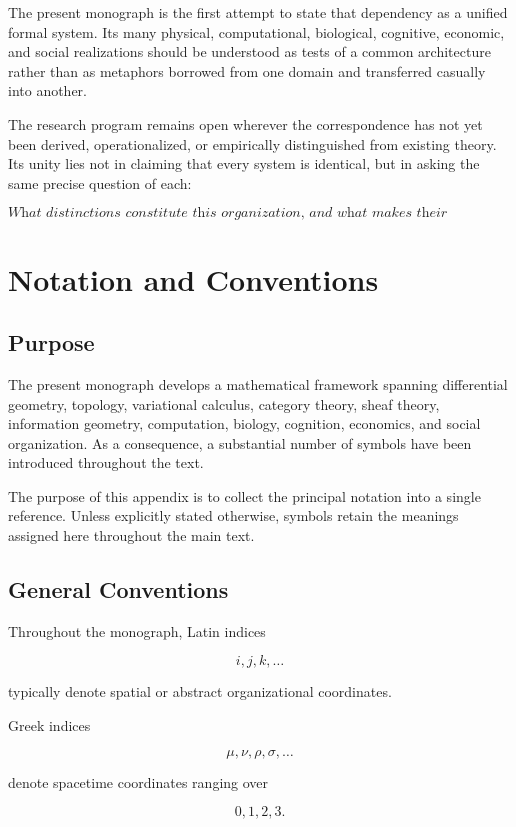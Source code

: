 \documentclass[11pt,oneside]{book}
\numberwithin{equation}{chapter}
\theoremstyle{definition}
\theoremstyle{plain}
\begin{document}
The present monograph is the first attempt to state that dependency as a
unified formal system. Its many physical, computational, biological,
cognitive, economic, and social realizations should be understood as tests
of a common architecture rather than as metaphors borrowed from one domain
and transferred casually into another.

The research program remains open wherever the correspondence has not yet
been derived, operationalized, or empirically distinguished from existing
theory. Its unity lies not in claiming that every system is identical, but
in asking the same precise question of each:

\[
\textit{What distinctions constitute this organization, and what makes
their continuation possible?}
\]

\chapter{Notation and Conventions}

\section{Purpose}

The present monograph develops a mathematical framework spanning
differential geometry, topology, variational calculus, category theory,
sheaf theory, information geometry, computation, biology, cognition,
economics, and social organization. As a consequence, a substantial
number of symbols have been introduced throughout the text.

The purpose of this appendix is to collect the principal notation into a
single reference. Unless explicitly stated otherwise, symbols retain the
meanings assigned here throughout the main text.

\section{General Conventions}

Throughout the monograph, Latin indices

\[
i,j,k,\ldots
\]

typically denote spatial or abstract organizational coordinates.

Greek indices

\[
\mu,\nu,\rho,\sigma,\ldots
\]

denote spacetime coordinates ranging over

\[
0,1,2,3.
\]
\end{document}
